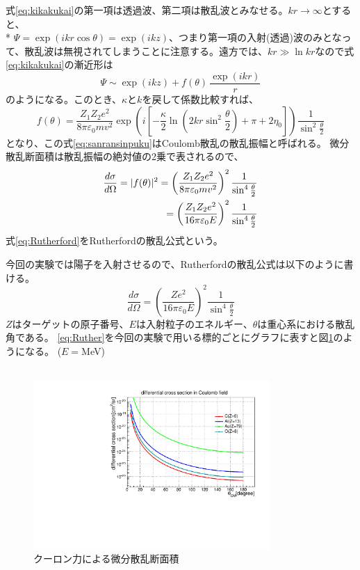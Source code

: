 \documentclass[a4paper,11pt,dvipdfmx]{jsarticle}
\begin{document}
式\eqref{eq:kikakukai}の第一項は透過波、第二項は散乱波とみなせる。$kr\rightarrow \infty$とすると、\\*
$\Psi = \exp(ikr\cos\theta)  =\exp(ikz)$、つまり第一項の入射(透過)波のみとなって、散乱波は無視されてしまうことに注意する。遠方では、$kr\gg\ln{kr}$なので式\eqref{eq:kikakukai}の漸近形は
\begin{equation}
 \Psi \sim \exp(ikz)+f(\theta)\,\frac{\exp(ikr)}{r} 
 \label{eq:zenkinn}
\end{equation}
のようになる。このとき、$\kappa$と$k$を戻して係数比較すれば、
\begin{equation}
    f(\theta)=\frac{Z_{1}Z_{2}e^2}{8\pi\varepsilon_{0}mv^2}\exp\left(i[-\frac{\kappa}{2}\ln(2kr\sin^2\frac{\theta}{2})+\pi+2\eta_{0}]\right)\frac{1}{\sin^2\frac{\theta}{2}}
    \label{eq:sanransinpuku}
\end{equation}
となり、この式\eqref{eq:sanransinpuku}はCoulomb散乱の散乱振幅と呼ばれる。
微分散乱断面積は散乱振幅の絶対値の2乗で表されるので、
\begin{align}
    \frac{d\sigma}{d\Omega} = |f(\theta)|^{2}=\left(\frac{Z_{1}Z_{2}e^2}{8\pi\varepsilon_{0}mv^2}\right)^{2}\frac{1}{\sin^4\frac{\theta}{2}} \notag\\
    = \left(\frac{Z_{1}Z_{2}e^2}{16\pi\varepsilon_{0}E}\right)^{2}\frac{1}{\sin^4\frac{\theta}{2}}\label{eq:Rutherford}
\end{align}
式\eqref{eq:Rutherford}をRutherfordの散乱公式という。

今回の実験では陽子を入射させるので、Rutherfordの散乱公式は以下のように書ける。
\begin{equation}
    \frac{d\sigma}{d\Omega}=\left(\frac{Ze^2}{16\pi\varepsilon_{0}E}\right)^{2}\frac{1}{\sin^4\frac{\theta}{2}}\label{eq:Ruther}
\end{equation}
$Z$はターゲットの原子番号、$E$は入射粒子のエネルギー、$\theta$は重心系における散乱角である。
\eqref{eq:Ruther}を今回の実験で用いる標的ごとにグラフに表すと図\ref{fig:cross}のようになる。
($E=$\;MeV) 
\\
\\
\begin{figure}[htbp]
\centering
\includegraphics[width=9cm]{picture/cstheory/newcr.pdf}
\caption{クーロン力による微分散乱断面積}
\label{fig:cross}
\end{figure}
\end{document}
